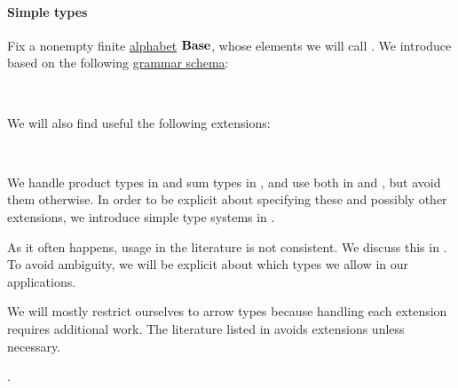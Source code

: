 \paragraph{Simple types}

\begin{definition}\label{def:simple_type}\mimprovised
  Fix a nonempty finite \hyperref[def:formal_language/alphabet]{alphabet} \( \op*{Base} \), whose elements we will call . We introduce  based on the following \hyperref[def:formal_grammar/schema]{grammar schema}:
  \begin{bnf*}
       {\bnftsq{(} \bnfsp {} \bnfsp \bnftsq{\( \synimplies \)} \bnfsp {} \bnfsp \bnftsq{)}} \\
             { \bnfor {}}
  \end{bnf*}

  We will also find useful the following extensions:
  \begin{bnf*}
     {\bnftsq{(} \bnfsp {} \bnfsp \bnftsq{\( \syntimes \)} \bnfsp {} \bnfsp \bnftsq{)}} \\
         {\bnftsq{(} \bnfsp {} \bnfsp \bnftsq{\( \synplus \)} \bnfsp {} \bnfsp \bnftsq{)}}
  \end{bnf*}

  We handle product types in  and sum types in , and use both in  and , but avoid them otherwise. In order to be explicit about specifying these and possibly other extensions, we introduce simple type systems in .
\end{definition}
\begin{comments}
  \item As it often happens, usage in the literature is not consistent. We discuss this in . To avoid ambiguity, we will be explicit about which types we allow in our applications.

  \item We will mostly restrict ourselves to arrow types because handling each extension requires additional work. The literature listed in  avoids extensions unless necessary.

  \item {}.
\end{comments}

